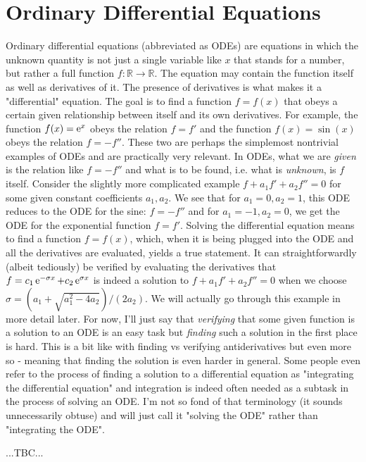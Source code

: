 \section{Ordinary Differential Equations} 
Ordinary differential equations (abbreviated as ODEs) are equations in which the unknown quantity is not just a single variable like $x$ that stands for a number, but rather a full function $f:\mathbb{R} \rightarrow \mathbb{R}$. The equation may contain the function itself as well as derivatives of it. The presence of derivatives is what makes it a "differential" equation. The goal is to find a function $f = f(x)$ that obeys a certain given relationship between itself and its own derivatives. For example, the function $f(x) = \operatorname{\mathrm{e}}^x$ obeys the relation $f = f'$ and the function $f(x) = \sin (x)$ obeys the relation $f = -f''$. These two are perhaps the simplemost nontrivial examples of ODEs and are practically very relevant. In ODEs, what we are \emph{given} is the relation like $f = -f''$ and what is to be found, i.e. what is \emph{unknown}, is $f$ itself. Consider the slightly more complicated example $f + a_1 f' + a_2 f'' = 0$ for some given constant coefficients $a_1, a_2$. We see that for $a_1 = 0, a_2 = 1$, this ODE reduces to the ODE for the sine: $f = -f''$ and for $a_1 = -1, a_2 = 0$, we get the ODE for the exponential function $f = f'$. Solving the differential equation means to find a function $f = f(x)$, which, when it is being plugged into the ODE and all the derivatives are evaluated, yields a true statement. It can straightforwardly (albeit tediously) be verified by evaluating the derivatives that $f = c_1 \operatorname{\mathrm{e}}^{-\sigma x} + c_2 \operatorname{\mathrm{e}}^{\sigma x}$ is indeed a solution to $f + a_1 f' + a_2 f'' = 0$ when we choose $\sigma = (a_1 + \sqrt{a_1^2 - 4 a_2})/(2 a_2)$. We will actually go through this example in more detail later. For now, I'll just say that \emph{verifying} that some given function is a solution to an ODE is an easy task but \emph{finding} such a solution in the first place is hard. This is a bit like with finding vs verifying antiderivatives but even more so - meaning that finding the solution is even harder in general. Some people even refer to the process of finding a solution to a differential equation as "integrating the differential equation" and integration is indeed often needed as a subtask in the process of solving an ODE. I'm not so fond of that terminology (it sounds unnecessarily obtuse) and will just call it "solving the ODE" rather than "integrating the ODE".

...TBC...


